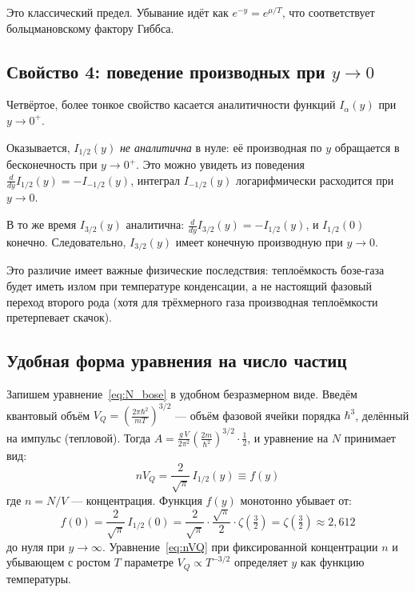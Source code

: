 \documentclass[../general/general]{subfiles}
\begin{document}
Это классический предел. Убывание идёт как $e^{-y} = e^{\mu/T}$, что соответствует больцмановскому фактору Гиббса.

\subsection{Свойство 4: поведение производных при $y \to 0$}

Четвёртое, более тонкое свойство касается аналитичности функций $I_\alpha(y)$ при $y \to 0^+$.

Оказывается, $I_{1/2}(y)$ \emph{не аналитична} в нуле: её производная по $y$ обращается в бесконечность при $y \to 0^+$. Это можно увидеть из поведения $\frac{d}{dy}I_{1/2}(y) = -I_{-1/2}(y)$, интеграл $I_{-1/2}(y)$ логарифмически расходится при $y \to 0$.

В то же время $I_{3/2}(y)$ аналитична: $\frac{d}{dy}I_{3/2}(y) = -I_{1/2}(y)$, и $I_{1/2}(0)$ конечно. Следовательно, $I_{3/2}(y)$ имеет конечную производную при $y \to 0$.

Это различие имеет важные физические последствия: теплоёмкость бозе-газа будет иметь излом при температуре конденсации, а не настоящий фазовый переход второго рода (хотя для трёхмерного газа производная теплоёмкости претерпевает скачок).

\subsection{Удобная форма уравнения на число частиц}

Запишем уравнение~\eqref{eq:N_bose} в удобном безразмерном виде. Введём квантовый объём $V_Q = \left(\frac{2\pi\hbar^2}{mT}\right)^{3/2}$ --- объём фазовой ячейки порядка $\hbar^3$, делённый на импульс (тепловой). Тогда $A = \frac{g\,V}{2\pi^2}\left(\frac{2m}{\hbar^2}\right)^{3/2}\!\cdot\frac{1}{2}$, и уравнение на $N$ принимает вид:
\begin{equation}
    n V_Q = \frac{2}{\sqrt{\pi}}\,I_{1/2}(y) \equiv f(y)
    \label{eq:nVQ}
\end{equation}
где $n = N/V$ --- концентрация. Функция $f(y)$ монотонно убывает от:
\begin{equation}
    f(0) = \frac{2}{\sqrt{\pi}}\,I_{1/2}(0) = \frac{2}{\sqrt{\pi}}\cdot\frac{\sqrt{\pi}}{2}\cdot\zeta\!\left(\tfrac{3}{2}\right) = \zeta\!\left(\tfrac{3}{2}\right) \approx 2{,}612
\end{equation}
до нуля при $y \to \infty$. Уравнение~\eqref{eq:nVQ} при фиксированной концентрации $n$ и убывающем с ростом $T$ параметре $V_Q \propto T^{-3/2}$ определяет $y$ как функцию температуры.
\end{document}
